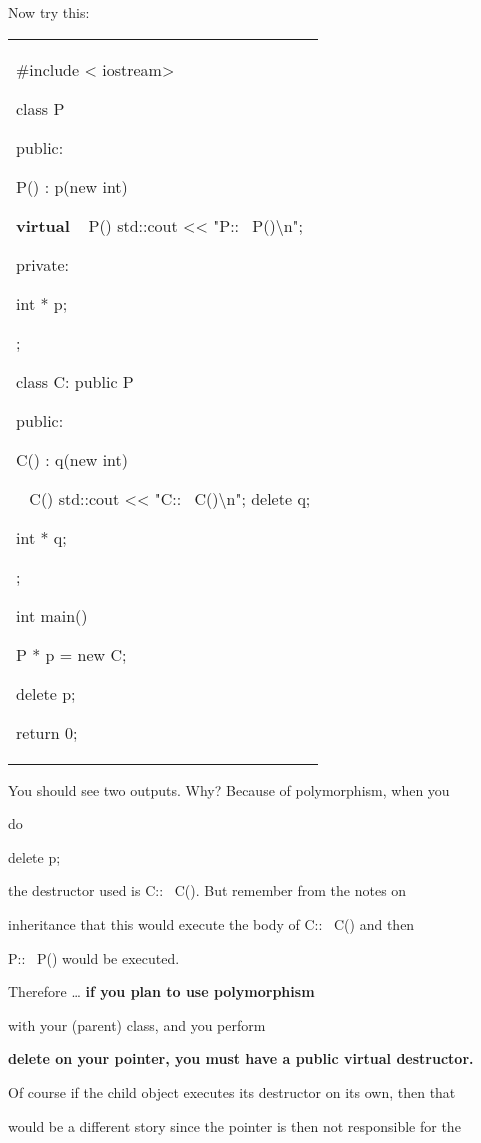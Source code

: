Now try this:

\begin{longtable}[]{@{}
  >{\raggedright\arraybackslash}p{}@{}}
\toprule\noalign{}
 \\
\midrule\noalign{}
\endhead
\bottomrule\noalign{}
\endlastfoot
\#include < iostream\textgreater{}

class P

{

public:

P() : p(new int) {}

\textbf{ virtual }~ P() { std::cout <<{}
"P::~ P()\textbackslash n"; }

private:

int * p;

};

class C: public P

{

public:

C() : q(new int) {}

~ C() { std::cout <<{}
"C::~ C()\textbackslash n"; delete q; }

int * q;

};

int main()

{

P * p = new C;

delete p;

return 0;

} \\
\end{longtable}

You should see two outputs. Why? Because of polymorphism, when you

do

delete p;

the destructor used is C::~ C(). But remember from the
notes on

inheritance that this would execute the body of C::~ C()
and then

P::~ P() would be executed.

Therefore \ldots{} \textbf{if you plan to use polymorphism}

with your (parent) class, and you perform

\textbf{delete on your pointer, you must have a public virtual
destructor.}

Of course if the child object executes its destructor on its own, then
that

would be a different story since the pointer is then not responsible for
the

